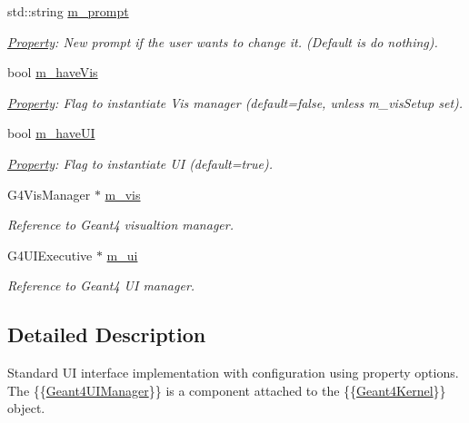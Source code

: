\begin{DoxyCompactItemize}
std::string \hyperlink{class_d_d4hep_1_1_simulation_1_1_geant4_u_i_manager_a64fbd1b49cb4e68cb8af888c946c1f1d}{m\_\-prompt}
\begin{DoxyCompactList}\small\item\em \hyperlink{class_d_d4hep_1_1_property}{Property}: New prompt if the user wants to change it. (Default is do nothing). \item\end{DoxyCompactList}\item 
bool \hyperlink{class_d_d4hep_1_1_simulation_1_1_geant4_u_i_manager_ae9d4d2c249167b2fb82ccec43d40000f}{m\_\-haveVis}
\begin{DoxyCompactList}\small\item\em \hyperlink{class_d_d4hep_1_1_property}{Property}: Flag to instantiate Vis manager (default=false, unless m\_\-visSetup set). \item\end{DoxyCompactList}\item 
bool \hyperlink{class_d_d4hep_1_1_simulation_1_1_geant4_u_i_manager_a3045697f75ed358629f23f9716775f29}{m\_\-haveUI}
\begin{DoxyCompactList}\small\item\em \hyperlink{class_d_d4hep_1_1_property}{Property}: Flag to instantiate UI (default=true). \item\end{DoxyCompactList}\item 
G4VisManager $\ast$ \hyperlink{class_d_d4hep_1_1_simulation_1_1_geant4_u_i_manager_a5c333e63d3fb38d0196d075ddac79fff}{m\_\-vis}
\begin{DoxyCompactList}\small\item\em Reference to Geant4 visualtion manager. \item\end{DoxyCompactList}\item 
G4UIExecutive $\ast$ \hyperlink{class_d_d4hep_1_1_simulation_1_1_geant4_u_i_manager_aeec06cd94ff75bad4130a535145be277}{m\_\-ui}
\begin{DoxyCompactList}\small\item\em Reference to Geant4 UI manager. \item\end{DoxyCompactList}\end{DoxyCompactItemize}


\subsection{Detailed Description}
Standard UI interface implementation with configuration using property options. The \{\{\hyperlink{class_d_d4hep_1_1_simulation_1_1_geant4_u_i_manager}{Geant4UIManager}\}\} is a component attached to the \{\{\hyperlink{class_d_d4hep_1_1_simulation_1_1_geant4_kernel}{Geant4Kernel}\}\} object.

